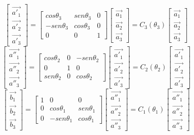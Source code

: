 \begin{equation}
\begin{bmatrix}
\vec{a'_1} \\ \vec{a'_2} \\ \vec{a'_3}
\end{bmatrix}
=
\begin{bmatrix}
cos\theta_3 & sen\theta_3 & 0 \\ -sen\theta_3 & cos\theta_3 & 0 \\ 0 & 0 & 1
\end{bmatrix}
\begin{bmatrix}
\vec{a_1} \\ \vec{a_2} \\ \vec{a_3}
\end{bmatrix}
=
C_3(\theta_3)
\begin{bmatrix}
\vec{a_1} \\ \vec{a_2} \\ \vec{a_3}
\end{bmatrix}
\end{equation}
\begin{equation}
\begin{bmatrix}
\vec{a''_1} \\ \vec{a''_2} \\ \vec{a''_3}
\end{bmatrix}
=
\begin{bmatrix}
cos\theta_2 & 0 & -sen\theta_2 \\ 0 & 1 & 0 \\ sen\theta_2 & 0 & cos\theta_2
\end{bmatrix}
\begin{bmatrix}
\vec{a'_1} \\ \vec{a'_2} \\ \vec{a'_3}
\end{bmatrix}
=
C_2(\theta_2)\begin{bmatrix}
\vec{a'_1} \\ \vec{a'_2} \\ \vec{a'_3}
\end{bmatrix}
\end{equation}
\begin{equation} \begin{bmatrix}
\vec{b_1} \\ \vec{b_2} \\ \vec{b_3}
\end{bmatrix}=
\begin{bmatrix}
1 & 0 & 0 \\ 0 & cos\theta_1 & sen\theta_1 \\ 0 & -sen\theta_1 & cos\theta_1 
\end{bmatrix}\begin{bmatrix}
\vec{a''_1} \\ \vec{a''_2} \\ \vec{a''_3}
\end{bmatrix}=
C_1(\theta_1)\begin{bmatrix}
\vec{a''_1} \\ \vec{a''_2} \\ \vec{a''_3}
\end{bmatrix}
\end{equation}

